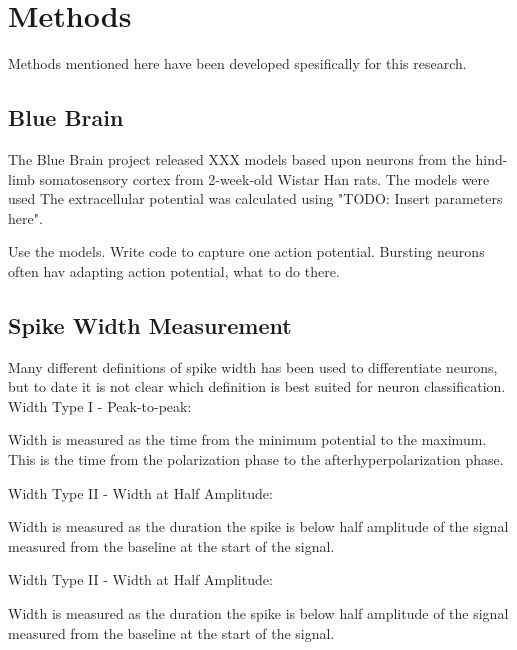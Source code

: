 \documentclass[altfont, fleqn]{uiophd}
\begin{document}
\chapter{Methods}
Methods mentioned here have been developed spesifically for this research. 
\vspace{1em} 
\startcontents
{}
\section{Blue Brain}
The Blue Brain project released XXX models based upon neurons from 
the hind-limb somatosensory cortex
from 2-week-old Wistar Han rats.
The models were used
The extracellular potential was calculated using 
"TODO: Insert parameters here". 

Use the models. Write code to capture one action potential. Bursting neurons
often hav adapting action potential, what to do there. 

\section{Spike Width Measurement}
Many different definitions of spike width has been used to differentiate neurons, but
to date it is not clear which definition is best suited for neuron classification. 
\\

\noindent 
Width Type I - Peak-to-peak: 

Width is measured as the time from the minimum potential to the maximum. 
This is the time from the polarization phase to the afterhyperpolarization phase. 
\newline

\noindent
Width Type II - Width at Half Amplitude:

Width is measured as the duration the spike is below half amplitude of the signal measured
from the baseline at the start of the signal. 
\newline

\noindent
Width Type II - Width at Half Amplitude:

Width is measured as the duration the spike is below half amplitude of the signal measured
from the baseline at the start of the signal. 
\newline
\end{document}
